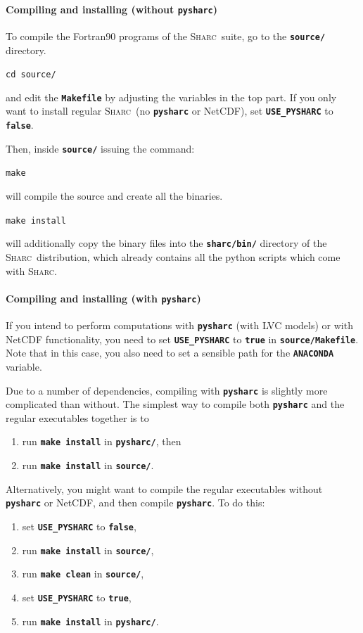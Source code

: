 \documentclass[a4paper,10pt,DIV=15,openany]{scrbook}
\newcommand{\sharc}{\textsc{Sharc}}
\newcommand{\ttt}[1]{\textbf{\texttt{#1}}}
\newenvironment{example}{
  \setlength{\OuterFrameSep}{3pt}
  \vspace{0mm}
  \definecolor{shadecolor}{HTML}{E4F4FF}
  \begin{shaded}
}{
  \end{shaded}
}
\begin{document}
\paragraph{Compiling and installing (without \ttt{pysharc})}

To compile the Fortran90 programs of the \sharc\ suite, go to the \ttt{source/} directory.
\begin{example}
\verb|cd source/|
\end{example}
and edit the \ttt{Makefile} by adjusting the variables in the top part.
If you only want to install regular \sharc\ (no \ttt{pysharc} or NetCDF), set \ttt{USE\_PYSHARC} to \ttt{false}.

Then, inside \ttt{source/} issuing the command:
\begin{example}
\verb|make|
\end{example}
will compile the source and create all the binaries.
\begin{example}
\verb|make install|
\end{example}
will additionally copy the binary files into the \ttt{sharc/bin/} directory of the 
\sharc\ distribution, which already contains all the python scripts which
come with \sharc.

\paragraph{Compiling and installing (with \ttt{pysharc})}

If you intend to perform computations with \ttt{pysharc} (with LVC models) or with NetCDF functionality, you need to set \ttt{USE\_PYSHARC} to \ttt{true} in \ttt{source/Makefile}.
Note that in this case, you also need to set a sensible path for the \ttt{ANACONDA} variable.

Due to a number of dependencies, compiling with \ttt{pysharc} is slightly more complicated than without.
The simplest way to compile both \ttt{pysharc} and the regular executables together is to
\begin{enumerate}
  \item run \ttt{make install} in \ttt{pysharc/}, then
  \item run \ttt{make install} in \ttt{source/}.
\end{enumerate}

Alternatively, you might want to compile the regular executables without \ttt{pysharc} or NetCDF, and then compile \ttt{pysharc}.
To do this:
\begin{enumerate}
  \item set \ttt{USE\_PYSHARC} to \ttt{false},
  \item run \ttt{make install} in \ttt{source/},
  \item run \ttt{make clean} in \ttt{source/},
  \item set \ttt{USE\_PYSHARC} to \ttt{true},
  \item run \ttt{make install} in \ttt{pysharc/}.
\end{enumerate}
\end{document}
